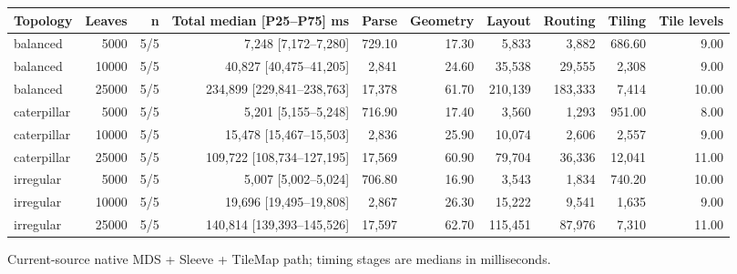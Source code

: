 \begin{tabular}{lrrrrrrrrr}
\hline
Topology & Leaves & n & Total median [P25--P75] ms & Parse & Geometry & Layout & Routing & Tiling & Tile levels \\
\hline
balanced & 5000 & 5/5 & 7,248 [7,172--7,280] & 729.10 & 17.30 & 5,833 & 3,882 & 686.60 & 9.00 \\
balanced & 10000 & 5/5 & 40,827 [40,475--41,205] & 2,841 & 24.60 & 35,538 & 29,555 & 2,308 & 9.00 \\
balanced & 25000 & 5/5 & 234,899 [229,841--238,763] & 17,378 & 61.70 & 210,139 & 183,333 & 7,414 & 10.00 \\
caterpillar & 5000 & 5/5 & 5,201 [5,155--5,248] & 716.90 & 17.40 & 3,560 & 1,293 & 951.00 & 8.00 \\
caterpillar & 10000 & 5/5 & 15,478 [15,467--15,503] & 2,836 & 25.90 & 10,074 & 2,606 & 2,557 & 9.00 \\
caterpillar & 25000 & 5/5 & 109,722 [108,734--127,195] & 17,569 & 60.90 & 79,704 & 36,336 & 12,041 & 11.00 \\
irregular & 5000 & 5/5 & 5,007 [5,002--5,024] & 706.80 & 16.90 & 3,543 & 1,834 & 740.20 & 10.00 \\
irregular & 10000 & 5/5 & 19,696 [19,495--19,808] & 2,867 & 26.30 & 15,222 & 9,541 & 1,635 & 9.00 \\
irregular & 25000 & 5/5 & 140,814 [139,393--145,526] & 17,597 & 62.70 & 115,451 & 87,976 & 7,310 & 11.00 \\
\hline
\end{tabular}

\par\smallskip
\footnotesize Current-source native MDS + Sleeve + TileMap path; timing stages are medians in milliseconds.
